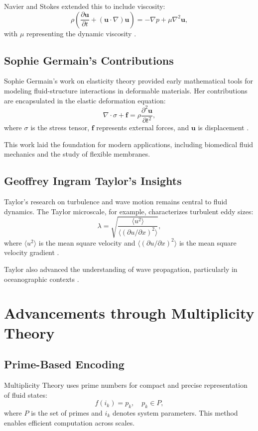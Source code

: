 \documentclass{article}
\theoremstyle{plain}
\begin{document}
Navier and Stokes extended this to include viscosity:
\begin{equation}
\rho \left( \frac{\partial \mathbf{u}}{\partial t} + (\mathbf{u} \cdot \nabla) \mathbf{u} \right) = -\nabla p + \mu \nabla^2 \mathbf{u},
\end{equation}
with $\mu$ representing the dynamic viscosity \cite{navier1827,stokes1845}.

\subsection{Sophie Germain's Contributions}
Sophie Germain's work on elasticity theory provided early mathematical tools for modeling fluid-structure interactions in deformable materials. Her contributions are encapsulated in the elastic deformation equation:
\begin{equation}
\nabla \cdot \sigma + \mathbf{f} = \rho \frac{\partial^2 \mathbf{u}}{\partial t^2},
\end{equation}
where $\sigma$ is the stress tensor, $\mathbf{f}$ represents external forces, and $\mathbf{u}$ is displacement \cite{dalmasso2016sophie}.

This work laid the foundation for modern applications, including biomedical fluid mechanics and the study of flexible membranes.

\subsection{Geoffrey Ingram Taylor's Insights}
Taylor's research on turbulence and wave motion remains central to fluid dynamics. The Taylor microscale, for example, characterizes turbulent eddy sizes:
\begin{equation}
\lambda = \sqrt{\frac{\langle u^2 \rangle}{\langle (\partial u / \partial x)^2 \rangle}},
\end{equation}
where $\langle u^2 \rangle$ is the mean square velocity and $\langle (\partial u / \partial x)^2 \rangle$ is the mean square velocity gradient \cite{taylor1938production}.

Taylor also advanced the understanding of wave propagation, particularly in oceanographic contexts \cite{taylor1955wave}.

\section{Advancements through Multiplicity Theory}
\subsection{Prime-Based Encoding}
Multiplicity Theory uses prime numbers for compact and precise representation of fluid states:
\begin{equation}
f(i_k) = p_k, \quad p_k \in P,
\end{equation}
where $P$ is the set of primes and $i_k$ denotes system parameters. This method enables efficient computation across scales.
\end{document}

